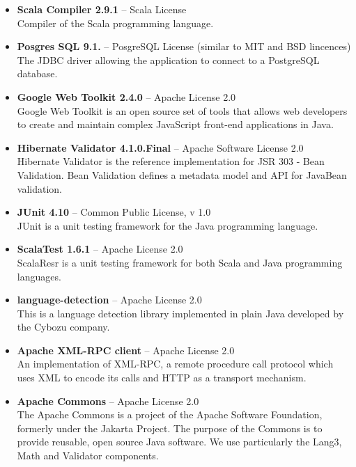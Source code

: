 \begin{itemize}
\item {\bf Scala Compiler 2.9.1} -- Scala License \\
Compiler of the Scala programming language.
\item {\bf Posgres SQL 9.1.} -- PosgreSQL License (similar to MIT and BSD lincences) \\
The JDBC driver allowing the application to connect to a PostgreSQL database.
\item {\bf Google Web Toolkit 2.4.0} -- Apache License 2.0 \\
Google Web Toolkit is an open source set of tools that allows web developers to create and maintain complex JavaScript front-end applications in Java.

\item {\bf Hibernate Validator 4.1.0.Final} -- Apache Software License 2.0 \\
Hibernate Validator is the reference implementation for JSR 303 - Bean Validation. Bean Validation defines a metadata model and API for JavaBean validation.


\item {\bf JUnit 4.10} -- Common Public License, v 1.0 \\
JUnit is a unit testing framework for the Java programming language.

\item {\bf ScalaTest 1.6.1} -- Apache License 2.0 \\
ScalaResr is a unit testing framework for both Scala and Java programming languages.

\item {\bf language-detection} -- Apache License 2.0 \\
This is a language detection library implemented in plain Java developed by the Cybozu company.

\item {\bf Apache XML-RPC client} -- Apache License 2.0  \\
An implementation of XML-RPC, a remote procedure call protocol which uses XML to encode its calls and HTTP as a transport mechanism.

\item {\bf Apache Commons} -- Apache License 2.0 \\
The Apache Commons is a project of the Apache Software Foundation, formerly under the Jakarta Project. The purpose of the Commons is to provide reusable, open source Java software. We use particularly the Lang3, Math and Validator components.


\end{itemize}
